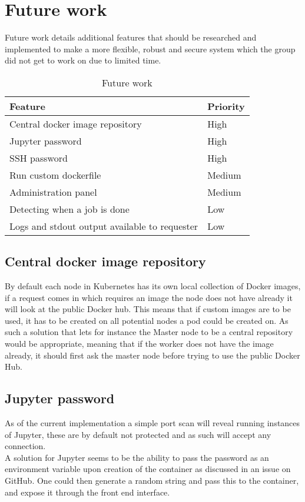 \documentclass[../main.tex]{subfiles}
\begin{document}



\newpage\section{Future work}
Future work details additional features that should be researched and implemented to make a more flexible, robust and secure system which the group did not get to work on due to limited time.
\begin{table}[H]
    \centering
    \begin{tabular}{|l|l|}
        \hline\textbf{Feature} & \textbf{Priority} \\\hline
        Central docker image repository & High \\\hline
        Jupyter password & High \\\hline
        SSH password & High \\\hline
        Run custom dockerfile & Medium\\\hline
        Administration panel & Medium \\\hline
        Detecting when a job is done & Low \\\hline
        Logs and stdout output available to requester & Low \\\hline
    \end{tabular}
    \caption{Future work}
    \label{tab:future_work}
\end{table}

\subsection*{Central docker image repository}
By default each node in Kubernetes has its own local collection of Docker images, if a request comes in which requires an image the node does not have already it will look at the public Docker hub. This means that if custom images are to be used, it has to be created on all potential nodes a pod could be created on. As such a solution that lets for instance the Master node to be a central repository would be appropriate, meaning that if the worker does not have the image already, it should first ask the master node before trying to use the public Docker Hub.

\subsection*{Jupyter password}
As of the current implementation a simple port scan will reveal running instances of Jupyter, these are by default not protected and as such will accept any connection. \\
A solution for Jupyter seems to be the ability to pass the password as an environment variable upon creation of the container as discussed in an issue on GitHub. \cite{jupyter_password} One could then generate a random string and pass this to the container, and expose it through the front end interface.
\end{document}
